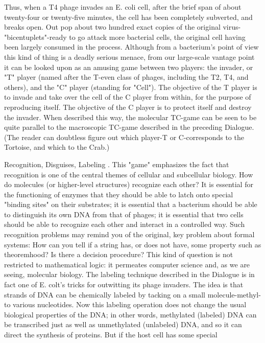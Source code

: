 {Thus, when a T4 phage invades an E. coli cell, after the brief span of about twenty-four or
twenty-five minutes, the cell has been completely subverted, and breaks open. Out pop about
two hundred exact copies of the original virus-"bicentuplets"-ready to go attack more
bacterial cells, the original cell having been largely consumed in the process.
        Although from a bacterium's point of view this kind of thing is a deadly serious
menace, from our large-scale vantage point it can be looked upon as an amusing game
between two players: the invader, or "T" player (named after the T-even class of phages,
including the T2, T4, and others), and the "C" player (standing for "Cell"). The objective of
the T player is to invade and take over the cell of the C player from within, for the purpose of
reproducing itself. The objective of the C player is to protect itself and destroy the invader.
When described this way, the molecular TC-game can be seen to be quite parallel to the
macroscopic TC-game described in the preceding Dialogue. (The reader can doubtless figure
out which player-T or C-corresponds to the Tortoise, and which to the Crab.)

                               Recognition, Disguises, Labeling
.
This "game" emphasizes the fact that recognition is one of the central themes of cellular and
subcellular biology. How do molecules (or higher-level structures) recognize each other? It is
essential for the functioning of enzymes that they should be able to latch onto special
"binding sites" on their substrates; it is essential that a bacterium should be able to distinguish
its own DNA from that of phages; it is essential that two cells should be able to recognize
each other and interact in a controlled way. Such recognition problems may remind you of
the original, key problem about formal systems: How can you tell if a string has, or does not
have, some property such as theoremhood? Is there a decision procedure? This kind of
question is not restricted to mathematical logic: it permeates computer science and, as we are
seeing, molecular biology.
        The labeling technique described in the Dialogue is in fact one of E. colt's tricks for
outwitting its phage invaders. The idea is that strands of DNA can be chemically labeled by
tacking on a small molecule-methyl-to various nucleotides. Now this labeling operation does
not change the usual biological properties of the DNA; in other words, methylated (labeled)
DNA can be transcribed just as well as unmethylated (unlabeled) DNA, and so it can direct
the synthesis of proteins. But if the host cell has some special




}
